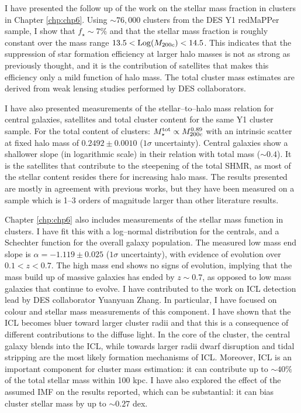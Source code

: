 I have presented the follow up of the work on the stellar mass fraction in clusters in Chapter \ref{chp:chp6}. Using $\sim 76,000$ clusters from the DES Y1 redMaPPer sample, I show that $f_\star\sim 7\%$ and that the stellar mass fraction is roughly constant over the mass range $13.5<{\rm Log} (M_{200c})<14.5$. This indicates that the suppression of star formation efficiency at larger halo masses is not as strong as previously thought, and it is the contribution of satellites that makes this efficiency only a mild function of halo mass. The total cluster mass estimates are derived from weak lensing studies performed by DES collaborators.

I have also presented measurements of the stellar--to--halo mass relation for central galaxies, satellites and total cluster content for the same Y1 cluster sample. For the total content of clusters: $M_\star^{\rm tot}\propto M_{200c}^{0.89}$ with an intrinsic scatter at fixed halo mass of $0.2492\pm 0.0010$ ($1\sigma$ uncertainty). Central galaxies show a shallower slope (in logarithmic scale) in their relation with total mass ($\sim 0.4$). It is the satellites that contribute to the steepening of the total SHMR, as most of the stellar content resides there for increasing halo mass. The results presented are mostly in agreement with previous works, but they have been measured on a sample which is 1--3 orders of magnitude larger than other literature results. 

Chapter \ref{chp:chp6} also includes measurements of the stellar mass function in clusters. I have fit this with a log--normal distribution for the centrals, and a Schechter function for the overall galaxy population. The measured low mass end slope is $\alpha=-1.119\pm 0.025$ ($1\sigma$ uncertainty), with evidence of evolution over $0.1<z<0.7$. The high mass end shows no signs of evolution, implying that the mass build up of massive galaxies has ended by $z\sim 0.7$, as opposed to low mass galaxies that continue to evolve. I have contributed to the work on ICL detection lead by DES collaborator Yuanyuan Zhang. In particular, I have focused on colour and stellar mass measurements of this component. I have shown that the ICL becomes bluer toward larger cluster radii and that this is a consequence of different contributions to the diffuse light. In the core of the cluster, the central galaxy blends into the ICL, while towards larger radii dwarf disruption and tidal stripping are the most likely formation mechanisms of ICL. Moreover, ICL is an important component for cluster mass estimation: it can contribute up to $\sim 40\%$ of the total stellar mass within 100 kpc. I have also explored the effect of the assumed IMF on the results reported, which can be substantial: it can bias cluster stellar mass by up to $\sim0.27$ dex.

